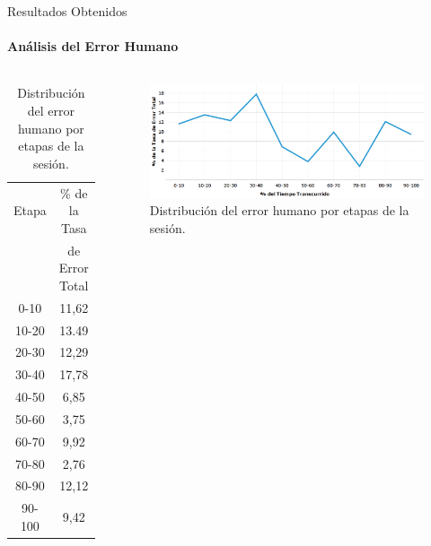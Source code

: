 \begin{frame}{Resultados Obtenidos}
\framesubtitle{An\'alisis del Error Humano}

\begin{columns}
\centering
\begin{table}
\tiny
\begin{tabular}{|c|c|}
\hline
    Etapa & \% de la Tasa \\ & de Error Total \\
    \hline
0-10  &  11,62 \\
10-20 &  13.49 \\
20-30 &  12,29 \\
30-40 &  17,78 \\
40-50 &  6,85 \\
50-60 &  3,75 \\
60-70 &  9,92 \\
70-80 &  2,76 \\
80-90 &  12,12 \\
90-100 & 9,42 \\
    \hline
\end{tabular}
\caption{Distribuci\'on del error humano por etapas de la sesi\'on.}
\label{sec:error-tiempo}
\end{table}
\begin{figure}
\centering
\includegraphics[width=1\linewidth]{./graphics/error_tiempo.png}
\caption{Distribuci\'on del error humano por etapas de la sesi\'on.}
\label{figure:gerror-tiempo}
\end{figure}
\end{columns}

\end{frame}

